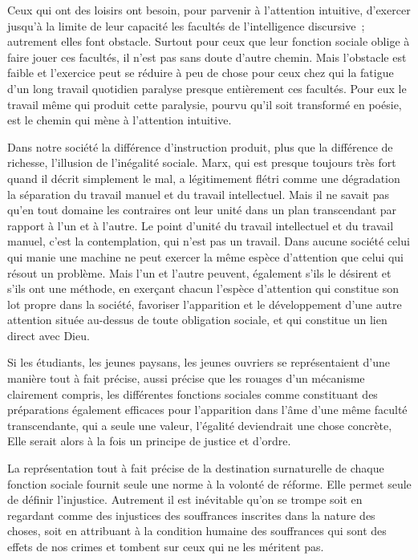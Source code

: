 \documentclass[french,twoside]{book} %
\begin{document}
Ceux qui ont des loisirs ont besoin, pour parvenir à l'attention intuitive, d'exercer jusqu'à la limite de leur capacité les facultés de l'intelligence discursive ; autrement elles font obstacle. Surtout pour ceux que leur fonction sociale oblige à faire jouer ces facultés, il n'est pas sans doute d'autre chemin. Mais l'obstacle est faible et l'exercice peut se réduire à peu de chose pour ceux chez qui la fatigue d'un long travail quotidien paralyse presque entièrement ces facultés. Pour eux le travail même qui produit cette paralysie, pourvu qu'il soit transformé en poésie, est le chemin qui mène à l'attention intuitive.\par
Dans notre société la différence d'instruction produit, plus que la différence de richesse, l'illusion de l'inégalité sociale. Marx, qui est presque toujours très fort quand il décrit simplement le mal, a légitimement flétri comme une dégradation la séparation du travail manuel et du travail intellectuel. Mais il ne savait pas qu'en tout domaine les contraires ont leur unité dans un plan transcendant par rapport à l'un et à l'autre. Le point d'unité du travail intellectuel et du travail manuel, c'est la contemplation, qui n'est pas un travail. Dans aucune société celui qui manie une machine ne peut exercer la même espèce d'attention que celui qui résout un problème. Mais l'un et l'autre peuvent, également s'ils le désirent et s'ils ont une méthode, en exerçant chacun l'espèce d'attention qui constitue son lot propre dans la société, favoriser l'apparition et le développement d'une autre attention située au-dessus de toute obligation sociale, et qui constitue un lien direct avec Dieu.\par
Si les étudiants, les jeunes paysans, les jeunes ouvriers se représentaient d'une manière tout à fait précise, aussi précise que les rouages d'un mécanisme clairement compris, les différentes fonctions sociales comme constituant des préparations également efficaces pour l'apparition dans l'âme d'une même faculté transcendante, qui a seule une valeur, l'égalité deviendrait une chose concrète, Elle serait alors à la fois un principe de justice et d'ordre.\par
La représentation tout à fait précise de la destination surnaturelle de chaque fonction sociale fournit seule une norme à la volonté de réforme. Elle permet seule de définir l'injustice. Autrement il est inévitable qu'on se trompe soit en regardant comme des injustices des souffrances inscrites dans la nature des choses, soit en attribuant à la condition humaine des souffrances qui sont des effets de nos crimes et tombent sur ceux qui ne les méritent pas.\par
\end{document}
